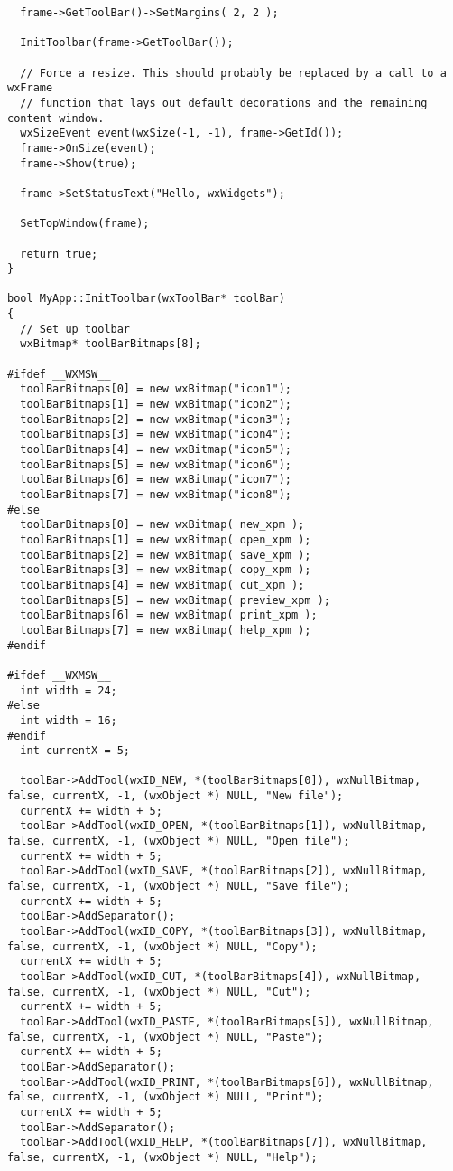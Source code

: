 {\begin{verbatim}
  frame->GetToolBar()->SetMargins( 2, 2 );

  InitToolbar(frame->GetToolBar());

  // Force a resize. This should probably be replaced by a call to a wxFrame
  // function that lays out default decorations and the remaining content window.
  wxSizeEvent event(wxSize(-1, -1), frame->GetId());
  frame->OnSize(event);
  frame->Show(true);

  frame->SetStatusText("Hello, wxWidgets");
  
  SetTopWindow(frame);

  return true;
}

bool MyApp::InitToolbar(wxToolBar* toolBar)
{
  // Set up toolbar
  wxBitmap* toolBarBitmaps[8];

#ifdef __WXMSW__
  toolBarBitmaps[0] = new wxBitmap("icon1");
  toolBarBitmaps[1] = new wxBitmap("icon2");
  toolBarBitmaps[2] = new wxBitmap("icon3");
  toolBarBitmaps[3] = new wxBitmap("icon4");
  toolBarBitmaps[4] = new wxBitmap("icon5");
  toolBarBitmaps[5] = new wxBitmap("icon6");
  toolBarBitmaps[6] = new wxBitmap("icon7");
  toolBarBitmaps[7] = new wxBitmap("icon8");
#else
  toolBarBitmaps[0] = new wxBitmap( new_xpm );
  toolBarBitmaps[1] = new wxBitmap( open_xpm );
  toolBarBitmaps[2] = new wxBitmap( save_xpm );
  toolBarBitmaps[3] = new wxBitmap( copy_xpm );
  toolBarBitmaps[4] = new wxBitmap( cut_xpm );
  toolBarBitmaps[5] = new wxBitmap( preview_xpm );
  toolBarBitmaps[6] = new wxBitmap( print_xpm );
  toolBarBitmaps[7] = new wxBitmap( help_xpm );
#endif

#ifdef __WXMSW__
  int width = 24;
#else
  int width = 16;
#endif
  int currentX = 5;

  toolBar->AddTool(wxID_NEW, *(toolBarBitmaps[0]), wxNullBitmap, false, currentX, -1, (wxObject *) NULL, "New file");
  currentX += width + 5;
  toolBar->AddTool(wxID_OPEN, *(toolBarBitmaps[1]), wxNullBitmap, false, currentX, -1, (wxObject *) NULL, "Open file");
  currentX += width + 5;
  toolBar->AddTool(wxID_SAVE, *(toolBarBitmaps[2]), wxNullBitmap, false, currentX, -1, (wxObject *) NULL, "Save file");
  currentX += width + 5;
  toolBar->AddSeparator();
  toolBar->AddTool(wxID_COPY, *(toolBarBitmaps[3]), wxNullBitmap, false, currentX, -1, (wxObject *) NULL, "Copy");
  currentX += width + 5;
  toolBar->AddTool(wxID_CUT, *(toolBarBitmaps[4]), wxNullBitmap, false, currentX, -1, (wxObject *) NULL, "Cut");
  currentX += width + 5;
  toolBar->AddTool(wxID_PASTE, *(toolBarBitmaps[5]), wxNullBitmap, false, currentX, -1, (wxObject *) NULL, "Paste");
  currentX += width + 5;
  toolBar->AddSeparator();
  toolBar->AddTool(wxID_PRINT, *(toolBarBitmaps[6]), wxNullBitmap, false, currentX, -1, (wxObject *) NULL, "Print");
  currentX += width + 5;
  toolBar->AddSeparator();
  toolBar->AddTool(wxID_HELP, *(toolBarBitmaps[7]), wxNullBitmap, false, currentX, -1, (wxObject *) NULL, "Help");


\end{verbatim}}
